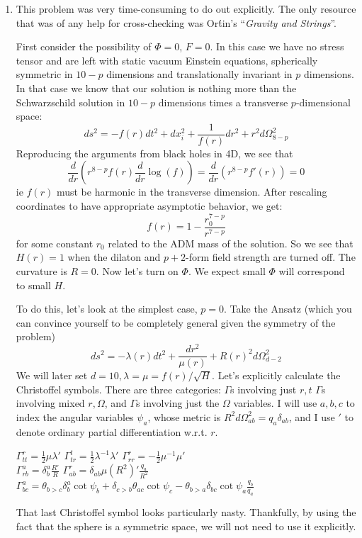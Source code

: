 \documentclass[11pt, class=article, crop=false]{standalone}
\begin{document}
\begin{enumerate}
	\item
		 This problem was very time-consuming to do out explicitly. The only resource that was of any help for cross-checking was Or\'tin's ``\emph{Gravity and Strings}''. 
	
	First consider the possibility of $\Phi = 0$, $F = 0$. In this case we have no stress tensor and are left with static vacuum Einstein equations, spherically symmetric in $10-p$ dimensions and translationally invariant in $p$ dimensions. In that case we know that our solution is nothing more than the Schwarzschild solution in $10-p$ dimensions times a transverse $p$-dimensional space:
	\[
		ds^2 = - f(r) dt^2 + dx_i^2 + \frac{1}{f(r)} dr^2 + r^2 d\Omega_{8-p}^2
	\]
	Reproducing the arguments from black holes in 4D, we see that 
	\[
		\frac{d}{dr} (r^{8-p} f(r) \frac{d}{dr} \log(f)) = \frac{d}{dr}(r^{8-p} f'(r)) = 0 
	\]
	ie $f(r)$ must be harmonic in the transverse dimension. After rescaling coordinates to have appropriate asymptotic behavior, we  get:
	\[
		f(r)  = 1 - \frac{r_0^{7-p}}{r^{7-p}}
	\]
	for some constant $r_0$ related to the ADM mass of the solution. So we see that $H(r) = 1$ when the dilaton and $p+2$-form field strength are turned off. The curvature is $R = 0$. Now let's turn on $\Phi$. We expect small $\Phi$ will correspond to small $H$. 
	
	To do this, let's look at the simplest case, $p=0$. Take the Ansatz (which you can convince yourself to be completely general given the symmetry of the problem)
	\[
		ds^2 = - \lambda(r) dt^2 + \frac{dr^2}{\mu(r)} + R(r)^2 d\Omega_{d-2}^2
	\]
	We will later set $d=10, \lambda = \mu = f(r)/\sqrt{H}$. Let's explicitly calculate the Christoffel symbols. There are three categories: $\Gamma$s involving just $r, t$ $\Gamma$s involving mixed $r, \Omega$, and $\Gamma$s involving just the $\Omega$ variables. I will use $a,b,c$ to index the angular variables $\psi_a$, whose metric is $R^2 d\Omega^2_{ab} = q_{a} \delta_{ab}$, and I use $'$ to denote ordinary partial differentiation w.r.t. $r$. 
	\begin{center}
			$\Gamma^r_{tt} = \frac12 \mu \lambda'$  \qquad $\Gamma^t_{tr} = \frac12 \lambda^{-1} \lambda'$ \qquad $\Gamma^r_{rr} = -\frac12 \mu^{-1} \mu'$\\
			$\Gamma^a_{rb} = \delta^a_b \frac{R'}{R}$ \qquad $\Gamma^r_{ab} = \delta_{ab} \mu (R^2)' \frac{q_a}{R^2}$ \\
			
		$\Gamma^{a}_{bc} = \theta_{b>c} \delta^a_b \cot \psi_b +  \delta_{c>b} \theta_{ac} \cot \psi_c - \theta_{b>a} \delta_{bc} \cot \psi_a \frac{q_b}{q_a}$
	\end{center}
	That last Christoffel symbol looks particularly nasty. Thankfully, by using the fact that the sphere is a symmetric space, we will not need to use it explicitly. 
	

\end{enumerate}
\end{document}
